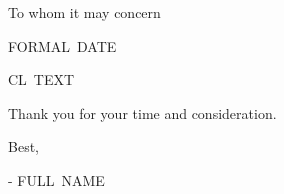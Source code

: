 \documentclass{resume} %
\begin{document}
  \begin{rSection}{To whom it may concern}

    FORMAL~DATE \newline 
      
    CL~TEXT \newline 

    Thank you for your time and consideration. \newline 

    Best, 

    - FULL~NAME

  \end{rSection}
\end{document}
